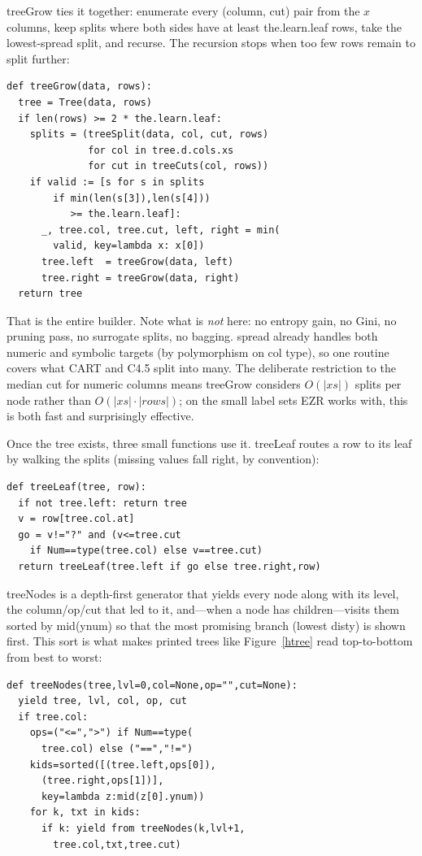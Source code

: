 \documentclass[AMA,STIX2COL]{WileyNJDv5}
\begin{document}
{\textsf{treeGrow} ties it together: enumerate every (column, cut)
pair from the $x$ columns, keep splits where both sides have at
least \textsf{the.learn.leaf} rows, take the lowest-spread split,
and recurse. The recursion stops when too few rows remain to split
further:
\begin{verbatim}
def treeGrow(data, rows): 
  tree = Tree(data, rows)
  if len(rows) >= 2 * the.learn.leaf:
    splits = (treeSplit(data, col, cut, rows)
              for col in tree.d.cols.xs
              for cut in treeCuts(col, rows))
    if valid := [s for s in splits
        if min(len(s[3]),len(s[4]))
           >= the.learn.leaf]:
      _, tree.col, tree.cut, left, right = min(
        valid, key=lambda x: x[0])
      tree.left  = treeGrow(data, left)
      tree.right = treeGrow(data, right)
  return tree
\end{verbatim}

That is the entire builder. Note what is {\em not} here: no entropy
gain, no Gini, no pruning pass, no surrogate splits, no bagging.
\textsf{spread} already handles both numeric and symbolic targets
(by polymorphism on \textsf{col} type), so one routine covers what
CART and C4.5 split into many. The deliberate restriction to the
median cut for numeric columns means \textsf{treeGrow} considers
$O(|\textit{xs}|)$ splits per node rather than $O(|\textit{xs}| \cdot
|\textit{rows}|)$; on the small label sets EZR works with, this is
both fast and surprisingly effective.

\smallskip

Once the tree exists, three small functions use it.
\textsf{treeLeaf} routes a row to its leaf by walking the splits
(missing values fall right, by convention):
\begin{verbatim}
def treeLeaf(tree, row): 
  if not tree.left: return tree
  v = row[tree.col.at]
  go = v!="?" and (v<=tree.cut
    if Num==type(tree.col) else v==tree.cut)
  return treeLeaf(tree.left if go else tree.right,row)
\end{verbatim}

\textsf{treeNodes} is a depth-first generator that yields every node
along with its level, the column/op/cut that led to it, and---when a
node has children---visits them sorted by \textsf{mid(ynum)} so that
the most promising branch (lowest \textsf{disty}) is shown first. This
sort is what makes printed trees like Figure~\ref{htree} read
top-to-bottom from best to worst:
\begin{verbatim}
def treeNodes(tree,lvl=0,col=None,op="",cut=None): 
  yield tree, lvl, col, op, cut
  if tree.col:
    ops=("<=",">") if Num==type(
      tree.col) else ("==","!=")
    kids=sorted([(tree.left,ops[0]),
      (tree.right,ops[1])],
      key=lambda z:mid(z[0].ynum))
    for k, txt in kids:
      if k: yield from treeNodes(k,lvl+1,
        tree.col,txt,tree.cut)
\end{verbatim}

}
\end{document}
